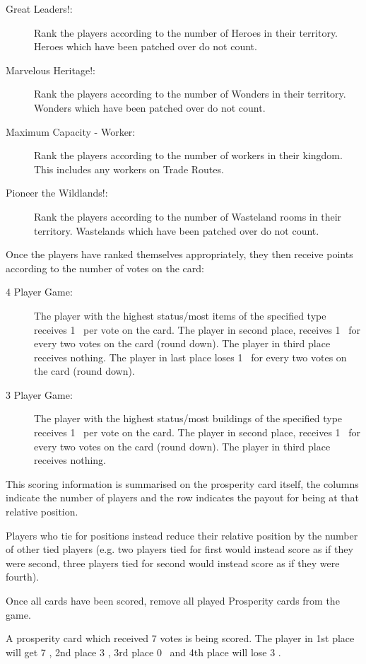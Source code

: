 \documentclass[10pt,twocolumn]{article}
\begin{document}
{\begin{description}
\item[Great Leaders!:] Rank the players according to the number of Heroes in their territory. Heroes which have been patched over do not count.
\item[Marvelous Heritage!:] Rank the players according to the number of Wonders in their territory. Wonders which have been patched over do not count.
\item[Maximum Capacity - Worker:] Rank the players according to the number of workers in their kingdom. This includes any workers on Trade Routes.
\item[Pioneer the Wildlands!:] Rank the players according to the number of Wasteland rooms in their territory. Wastelands which have been patched over do not count.
\end{description}
}
Once the players have ranked themselves appropriately, they then receive points according to the number of votes on the card:

\begin{description}
\item[4 Player Game:] The player with the highest status/most items of the specified type receives 1 \vp\ per vote on the card. The player in second place, receives 1 \vp\ for every two votes on the card (round down). The player in third place receives nothing. The player in last place loses 1 \vp\ for every two votes on the card (round down).

\item[3 Player Game:] The player with the highest status/most buildings of the specified type receives 1 \vp\ per vote on the card. The player in second place, receives 1 \vp\ for every two votes on the card (round down). The player in third place receives nothing.
\end{description}

This scoring information is summarised on the prosperity card itself, the columns indicate the number of players and the row indicates the payout for being at that relative position.

Players who tie for positions instead reduce their relative position by the number of other tied players (e.g. two players tied for first would instead score as if they were second, three players tied for second would instead score as if they were fourth).

Once all cards have been scored, remove all played Prosperity cards from the game.

\begin{BoxExample}A prosperity card which received 7 votes is being scored. The player in 1st place will get 7 \vps, 2nd place 3 \vps, 3rd place 0 \vps\ and 4th place will lose 3 \vps.\end{BoxExample}
\end{document}
